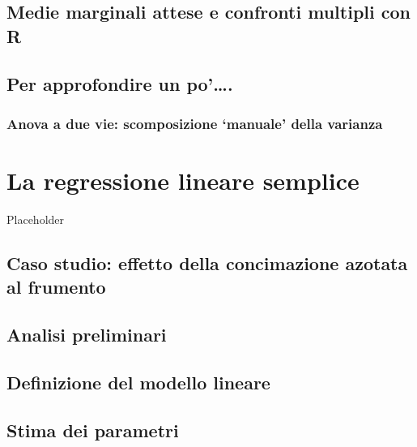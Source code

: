 \documentclass[a4paper,12pt,oneside]{book}
\begin{document}
\hypertarget{medie-marginali-attese-e-confronti-multipli-con-r}{%
\section{Medie marginali attese e confronti multipli con R}\label{medie-marginali-attese-e-confronti-multipli-con-r}}

\hypertarget{per-approfondire-un-po.}{%
\section{Per approfondire un po'\ldots{}.}\label{per-approfondire-un-po.}}

\hypertarget{anova-a-due-vie-scomposizione-manuale-della-varianza}{%
\subsection{Anova a due vie: scomposizione `manuale' della varianza}\label{anova-a-due-vie-scomposizione-manuale-della-varianza}}

\hypertarget{la-regressione-lineare-semplice}{%
\chapter{La regressione lineare semplice}\label{la-regressione-lineare-semplice}}

Placeholder

\hypertarget{caso-studio-effetto-della-concimazione-azotata-al-frumento}{%
\section{Caso studio: effetto della concimazione azotata al frumento}\label{caso-studio-effetto-della-concimazione-azotata-al-frumento}}

\hypertarget{analisi-preliminari}{%
\section{Analisi preliminari}\label{analisi-preliminari}}

\hypertarget{definizione-del-modello-lineare-1}{%
\section{Definizione del modello lineare}\label{definizione-del-modello-lineare-1}}

\hypertarget{stima-dei-parametri-3}{%
\section{Stima dei parametri}\label{stima-dei-parametri-3}}
\end{document}
